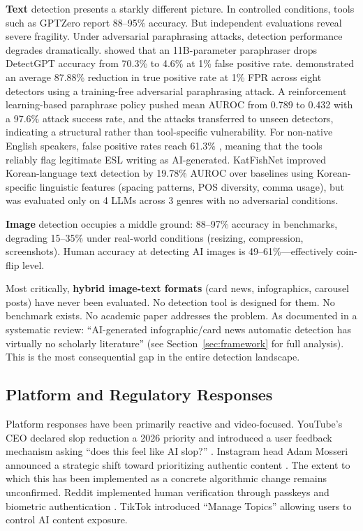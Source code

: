 \documentclass[12pt,a4paper]{article}
\begin{document}
\textbf{Text} detection presents a starkly different picture. In controlled conditions, tools such as GPTZero report 88--95\% accuracy. But independent evaluations reveal severe fragility. Under adversarial paraphrasing attacks, detection performance degrades dramatically. \textcite{Krishna2023} showed that an 11B-parameter paraphraser drops DetectGPT accuracy from 70.3\% to 4.6\% at 1\% false positive rate. \textcite{Cheng2025} demonstrated an average 87.88\% reduction in true positive rate at 1\% FPR across eight detectors using a training-free adversarial paraphrasing attack. A reinforcement learning-based paraphrase policy \parencite{Ranganath2026} pushed mean AUROC from 0.789 to 0.432 with a 97.6\% attack success rate, and the attacks transferred to unseen detectors, indicating a structural rather than tool-specific vulnerability. For non-native English speakers, false positive rates reach 61.3\% \parencite{Liang2023}, meaning that the tools reliably flag legitimate ESL writing as AI-generated. KatFishNet \parencite{Park2025} improved Korean-language text detection by 19.78\% AUROC over baselines using Korean-specific linguistic features (spacing patterns, POS diversity, comma usage), but was evaluated only on 4 LLMs across 3 genres with no adversarial conditions.

\textbf{Image} detection occupies a middle ground: 88--97\% accuracy in benchmarks, degrading 15--35\% under real-world conditions (resizing, compression, screenshots). Human accuracy at detecting AI images is 49--61\%---effectively coin-flip level.

Most critically, \textbf{hybrid image-text formats} (card news, infographics, carousel posts) have never been evaluated. No detection tool is designed for them. No benchmark exists. No academic paper addresses the problem. As documented in a systematic review: ``AI-generated infographic/card news automatic detection has virtually no scholarly literature'' (see Section~\ref{sec:framework} for full analysis). This is the most consequential gap in the entire detection landscape.

\subsection{Platform and Regulatory Responses}

Platform responses have been primarily reactive and video-focused. YouTube's CEO declared slop reduction a 2026 priority and introduced a user feedback mechanism asking ``does this feel like AI slop?'' \parencite{Dexerto2026}. Instagram head Adam Mosseri announced a strategic shift toward prioritizing authentic content \parencite{Mosseri2025}. The extent to which this has been implemented as a concrete algorithmic change remains unconfirmed. Reddit implemented human verification through passkeys and biometric authentication \parencite{WinBuzzer2026}. TikTok introduced ``Manage Topics'' allowing users to control AI content exposure.
\end{document}
